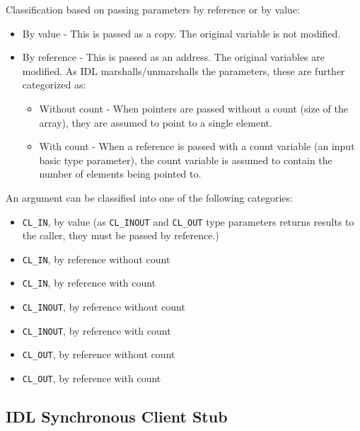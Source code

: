 \begin{flushleft}
Classification based on passing parameters by reference or by value:\begin{itemize}
\item
By value - This is passed as a copy. The original variable is not modified.
\item
By reference - This is passed as an address. The original variables are modified. As IDL marshalls/unmarshalls the parameters, these are 
further categorized as:
\begin{itemize}
\item
Without count - When pointers are passed without a count (size of the array), they are assumed to point to a single element.
\item
With count - When a reference is passed with a count variable (an input basic type parameter), the count variable is assumed to contain the 
number of elements being pointed to.
\end{itemize}
\end{itemize}

An argument can be classified into one of the following categories:
\begin{itemize}
\item
{\tt{CL\_\-IN}}, by value (as {\tt{CL\_\-INOUT}} and {\tt{CL\_\-OUT}} type parameters returns results to the caller, they must be passed by reference.)
\item

{\tt{CL\_\-IN}}, by reference without count
\item

{\tt{CL\_\-IN}}, by reference with count
\item

{\tt{CL\_\-INOUT}}, by reference without count
\item

{\tt{CL\_\-INOUT}}, by reference with count
\item

{\tt{CL\_\-OUT}}, by reference without count
\item

{\tt{CL\_\-OUT}}, by reference with count

\end{itemize}


\subsection{IDL Synchronous Client Stub}


\end{flushleft}
